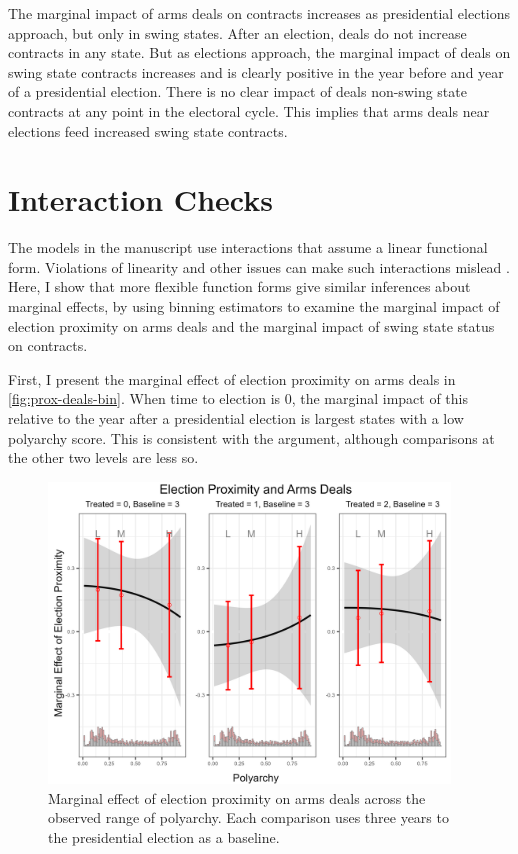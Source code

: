 \documentclass[12pt]{article}
\begin{document}
The marginal impact of arms deals on contracts increases as presidential elections approach, but only in swing states. 
After an election, deals do not increase contracts in any state. 
But as elections approach, the marginal impact of deals on swing state contracts increases and is clearly positive in the year before and year of a presidential election. 
There is no clear impact of deals non-swing state contracts at any point in the electoral cycle. 
This implies that arms deals near elections feed increased swing state contracts. 

\newpage 

\section{Interaction Checks}

The models in the manuscript use interactions that assume a linear functional form. 
Violations of linearity and other issues can make such interactions mislead \citep{Hainmuelleretal2019}. 
Here, I show that more flexible function forms give similar inferences about marginal effects, by using binning estimators to examine the marginal impact of election proximity on arms deals and the marginal impact of swing state status on contracts.


First, I present the marginal effect of election proximity on arms deals in \autoref{fig:prox-deals-bin}.
When time to election is 0, the marginal impact of this relative to the year after a presidential election is largest states with a low polyarchy score. 
This is consistent with the argument, although comparisons at the other two levels are less so. 



\begin{figure}[htpb]
	\centering
		\includegraphics[width=0.95\textwidth]{prox-deals-bin.png}
	\caption{Marginal effect of election proximity on arms deals across the observed range of polyarchy. Each comparison uses three years to the presidential election as a baseline.}
	\label{fig:prox-deals-bin}
\end{figure}
\end{document}
